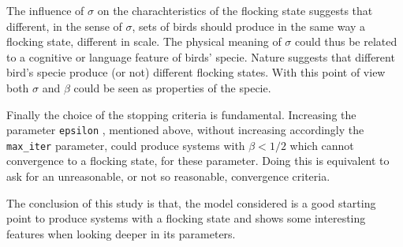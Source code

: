 \documentclass{article} %
\newcounter{late}
\begin{document}
The influence of $\sigma$ on the 
charachteristics of the flocking state suggests that different, in the sense of $\sigma$, sets 
of birds should produce in the same way a flocking state, different in scale. The physical meaning of $\sigma$
could thus be related to a cognitive or language feature of birds' specie. 
Nature suggests that different bird's specie produce (or not) different flocking states. With this
point of view both $\sigma$ and $\beta$ could be seen as properties of the specie.

Finally the choice of the stopping criteria is fundamental. Increasing the parameter \verb|epsilon| ,
mentioned above, without increasing accordingly the \verb|max_iter| parameter, could produce 
systems with $\beta<1/2$ which cannot convergence to a flocking state, for these parameter.
Doing this is equivalent to ask for an unreasonable, or not so reasonable, convergence criteria.

The conclusion of this study is that, the model considered is a good starting point to produce 
systems with a flocking state and shows some interesting features when looking deeper in its parameters.
\end{document}
